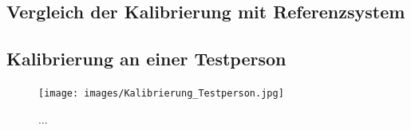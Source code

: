 	\subsection{Vergleich der Kalibrierung mit Referenzsystem}

\newpage

	\subsection{Kalibrierung an einer Testperson}
	
	\begin{figure}[h]
		\centering
		\texttt{[image: images/Kalibrierung\_Testperson.jpg]}
		\caption[Kalibrierung an einer Testperson]{...}
		\label{img:testperson}
	\end{figure}